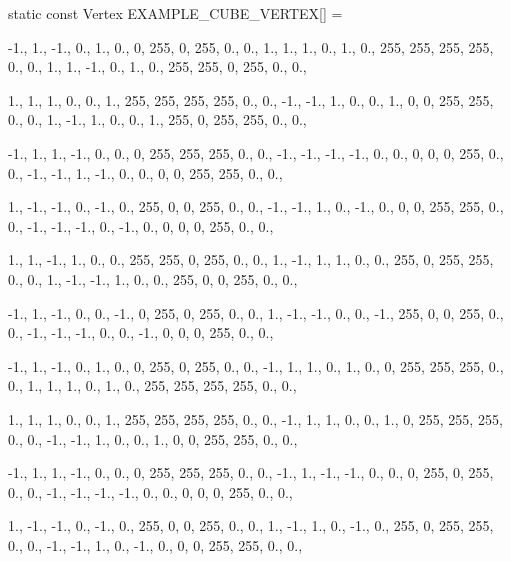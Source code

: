 \documentclass[14pt,a4paper]{extarticle}
\theoremstyle{definition}
\renewcommand{\[}{\begin{singlespace}\begin{equation*}}
\renewcommand{\]}{\end{equation*}\end{singlespace}}
\begin{document}
\begin{multicols}{2}
\begin{ccode}
static const Vertex EXAMPLE_CUBE_VERTEX[] = {
    {{-1.,  1., -1.}, { 0.,  1.,  0.}, {  0, 255,   0, 255}, {0., 0.}},
    {{ 1.,  1.,  1.}, { 0.,  1.,  0.}, {255, 255, 255, 255}, {0., 0.}},
    {{ 1.,  1., -1.}, { 0.,  1.,  0.}, {255, 255,   0, 255}, {0., 0.}},

    {{ 1.,  1.,  1.}, { 0.,  0.,  1.}, {255, 255, 255, 255}, {0., 0.}},
    {{-1., -1.,  1.}, { 0.,  0.,  1.}, {  0,   0, 255, 255}, {0., 0.}},
    {{ 1., -1.,  1.}, { 0.,  0.,  1.}, {255,   0, 255, 255}, {0., 0.}},

    {{-1.,  1.,  1.}, {-1.,  0.,  0.}, {  0, 255, 255, 255}, {0., 0.}},
    {{-1., -1., -1.}, {-1.,  0.,  0.}, {  0,   0,   0, 255}, {0., 0.}},
    {{-1., -1.,  1.}, {-1.,  0.,  0.}, {  0,   0, 255, 255}, {0., 0.}},

    {{ 1., -1., -1.}, { 0., -1.,  0.}, {255,   0,   0, 255}, {0., 0.}},
    {{-1., -1.,  1.}, { 0., -1.,  0.}, {  0,   0, 255, 255}, {0., 0.}},
    {{-1., -1., -1.}, { 0., -1.,  0.}, {  0,   0,   0, 255}, {0., 0.}},

    {{ 1.,  1., -1.}, { 1.,  0.,  0.}, {255, 255,   0, 255}, {0., 0.}},
    {{ 1., -1.,  1.}, { 1.,  0.,  0.}, {255,   0, 255, 255}, {0., 0.}},
    {{ 1., -1., -1.}, { 1.,  0.,  0.}, {255,   0,   0, 255}, {0., 0.}},

    {{-1.,  1., -1.}, { 0.,  0., -1.}, {  0, 255,   0, 255}, {0., 0.}},
    {{ 1., -1., -1.}, { 0.,  0., -1.}, {255,   0,   0, 255}, {0., 0.}},
    {{-1., -1., -1.}, { 0.,  0., -1.}, {  0,   0,   0, 255}, {0., 0.}},

    {{-1.,  1., -1.}, { 0.,  1.,  0.}, {  0, 255,   0, 255}, {0., 0.}},
    {{-1.,  1.,  1.}, { 0.,  1.,  0.}, {  0, 255, 255, 255}, {0., 0.}},
    {{ 1.,  1.,  1.}, { 0.,  1.,  0.}, {255, 255, 255, 255}, {0., 0.}},

    {{ 1.,  1.,  1.}, { 0.,  0.,  1.}, {255, 255, 255, 255}, {0., 0.}},
    {{-1.,  1.,  1.}, { 0.,  0.,  1.}, {  0, 255, 255, 255}, {0., 0.}},
    {{-1., -1.,  1.}, { 0.,  0.,  1.}, {  0,   0, 255, 255}, {0., 0.}},

    {{-1.,  1.,  1.}, {-1.,  0.,  0.}, {  0, 255, 255, 255}, {0., 0.}},
    {{-1.,  1., -1.}, {-1.,  0.,  0.}, {  0, 255,   0, 255}, {0., 0.}},
    {{-1., -1., -1.}, {-1.,  0.,  0.}, {  0,   0,   0, 255}, {0., 0.}},

    {{ 1., -1., -1.}, { 0., -1.,  0.}, {255,   0,   0, 255}, {0., 0.}},
    {{ 1., -1.,  1.}, { 0., -1.,  0.}, {255,   0, 255, 255}, {0., 0.}},
    {{-1., -1.,  1.}, { 0., -1.,  0.}, {  0,   0, 255, 255}, {0., 0.}},

}
\end{ccode}
\end{multicols}
\end{document}

